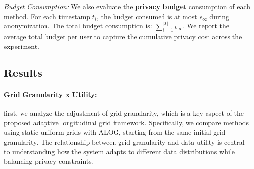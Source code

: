 
\textit{Budget Consumption:}  
We also evaluate the \textbf{privacy budget} consumption of each method. For each timestamp \( t_i \), the budget consumed is at most \( \epsilon_\infty \) during anonymization. The total budget consumption is: $\sum_{i=1}^{|T|} \epsilon_\infty$. We report the average total budget per user to capture the cumulative privacy cost across the experiment.



\subsection{Results}

\paragraph{Grid Granularity x Utility:}first, we analyze the adjustment of grid granularity, which is a key aspect of the proposed adaptive longitudinal grid framework. Specifically, we compare methods using static uniform grids with ALOG, starting from the same initial grid granularity. The relationship between grid granularity and data utility is central to understanding how the system adapts to different data distributions while balancing privacy constraints.



